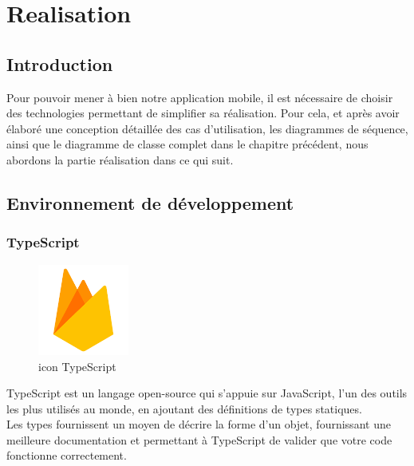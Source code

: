 \chapter{Realisation}

\section*{Introduction}
Pour pouvoir mener à bien notre application mobile, il est nécessaire de choisir des technologies permettant de simplifier sa réalisation. Pour cela, et après avoir élaboré une conception détaillée des cas d’utilisation, les diagrammes de séquence, ainsi que le diagramme de classe complet dans le chapitre précédent, nous abordons la partie réalisation dans ce qui suit.

\section{Environnement de développement }
\subsection{TypeScript}
\begin{figure}[!h]
  \centering
\includegraphics[width=3cm,height=3cm,keepaspectratio]{figure/fig2.PNG}
  \caption{icon TypeScript}
\end{figure}


TypeScript est un langage open-source qui s’appuie sur JavaScript, l’un des outils les plus utilisés au monde, en ajoutant des définitions de types statiques.\\

Les types fournissent un moyen de décrire la forme d’un objet, fournissant une meilleure documentation et permettant à TypeScript de valider que votre code fonctionne correctement.




